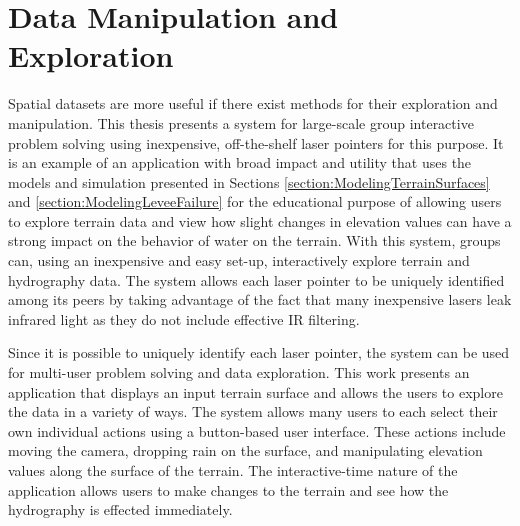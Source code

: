 

\section{Data Manipulation and Exploration}

Spatial datasets are more useful if there exist methods for their exploration and manipulation. This thesis presents a system for large-scale group interactive problem solving using inexpensive, off-the-shelf laser pointers for this purpose. It is an example of an application with broad impact and utility that uses the models and simulation presented in Sections \ref{section:ModelingTerrainSurfaces} and \ref{section:ModelingLeveeFailure} for the educational purpose of allowing users to explore terrain data and view how slight changes in elevation values can have a strong impact on the behavior of water on the terrain.
% 
With this system, groups can, using an inexpensive and easy set-up, interactively explore terrain and hydrography data. The system allows each laser pointer to be uniquely identified among its peers by taking advantage of the fact that many inexpensive lasers leak infrared light as they do not include effective IR filtering. 

Since it is possible to uniquely identify each laser pointer, the system can be used for multi-user problem solving and data exploration. This work presents an application that displays an input terrain surface and allows the users to explore the data in a variety of ways. The system allows many users to each select their own individual actions using a button-based user interface. These actions include moving the camera, dropping rain on the surface, and manipulating elevation values along the surface of the terrain. The interactive-time nature of the application allows users to make changes to the terrain and see how the hydrography is effected immediately.

